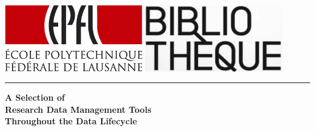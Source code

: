 \begin{titlepage}

\begin{center}
\begin{minipage}[!t]{0.66\textwidth}
\begin{center}
    \includegraphics[width=0.45\textwidth]{./images/epfl_logo.png}
    \includegraphics[width=0.45\textwidth]{./images/logo_biblio.png}  \\
\end{center}
\end{minipage}
\end{center}


\begin{center}


\hrule

\vspace{3cm}

{ \huge \bfseries A Selection of \\ Research Data Management Tools \\ Throughout the Data Lifecycle}


\end{center}
\end{titlepage}
